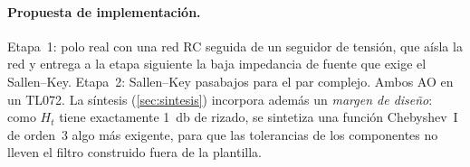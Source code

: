 \paragraph{Propuesta de implementación.} Etapa~1: polo real con una red RC seguida de un seguidor de tensión, que aísla la red y entrega
a la etapa siguiente la baja impedancia de fuente que exige el Sallen--Key. Etapa~2: Sallen--Key pasabajos para el par complejo. Ambos AO en un
TL072. La síntesis (\cref{sec:sintesis}) incorpora además un \emph{margen de diseño}: como $H_t$ tiene exactamente \qty{1}{\decibel} de rizado,
se sintetiza una función Chebyshev~I de orden~3 algo más exigente, para que las tolerancias de los componentes no lleven el filtro construido fuera
de la plantilla.
